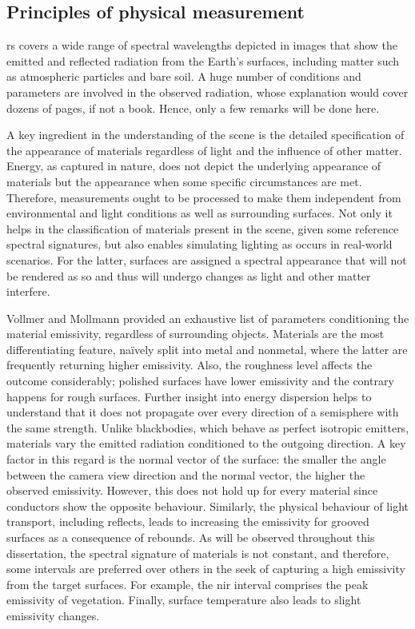 \subsection{Principles of physical measurement}

\acrshort{rs} covers a wide range of spectral wavelengths depicted in images that show the emitted and reflected radiation from the Earth's surfaces, including matter such as atmospheric particles and bare soil. A huge number of conditions and parameters are involved in the observed radiation, whose explanation would cover dozens of pages, if not a book. Hence, only a few remarks will be done here. 

A key ingredient in the understanding of the scene is the detailed specification of the appearance of materials regardless of light and the influence of other matter. Energy, as captured in nature, does not depict the underlying appearance of materials but the appearance when some specific circumstances are met. Therefore, measurements ought to be processed to make them independent from environmental and light conditions as well as surrounding surfaces. Not only it helps in the classification of materials present in the scene, given some reference spectral signatures, but also enables simulating lighting as occurs in real-world scenarios. For the latter, surfaces are assigned a spectral appearance that will not be rendered as so and thus will undergo changes as light and other matter interfere. 

Vollmer and Mollmann \cite{vollmer_infrared_2017} provided an exhaustive list of parameters conditioning the material emissivity, regardless of surrounding objects. Materials are the most differentiating feature, naïvely split into metal and nonmetal, where the latter are frequently returning higher emissivity. Also, the roughness level affects the outcome considerably; polished surfaces have lower emissivity and the contrary happens for rough surfaces. Further insight into energy dispersion helps to understand that it does not propagate over every direction of a semisphere with the same strength. Unlike blackbodies, which behave as perfect isotropic emitters, materials vary the emitted radiation conditioned to the outgoing direction. A key factor in this regard is the normal vector of the surface: the smaller the angle between the camera view direction and the normal vector, the higher the observed emissivity. However, this does not hold up for every material since conductors show the opposite behaviour. Similarly, the physical behaviour of light transport, including reflects, leads to increasing the emissivity for grooved surfaces as a consequence of rebounds. As will be observed throughout this dissertation, the spectral signature of materials is not constant, and therefore, some intervals are preferred over others in the seek of capturing a high emissivity from the target surfaces. For example, the \acrshort{nir} interval comprises the peak emissivity of vegetation. Finally, surface temperature also leads to slight emissivity changes.

